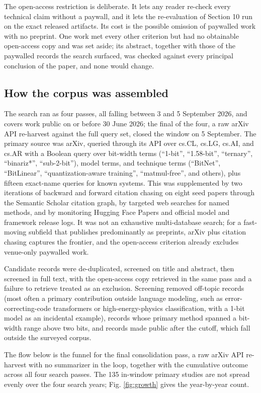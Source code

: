 \documentclass[11pt]{article}
\begin{document}
The open-access restriction is deliberate. It lets any reader re-check every technical
claim without a paywall, and it lets the re-evaluation of Section 10 run on the exact
released artifacts. Its cost is the possible omission of paywalled work with no preprint.
One work met every other criterion but had no obtainable open-access copy and was set
aside; its abstract, together with those of the paywalled records the search surfaced,
was checked against every principal conclusion of the paper, and none would change.

\subsection{How the corpus was assembled}

The search ran as four passes, all falling between 3 and 5 September 2026, and covers
work public on or before 30 June 2026; the final of the four, a raw arXiv API re-harvest
against the full query set, closed the window on 5 September. The primary source was
arXiv, queried through its API over cs.CL,
cs.LG, cs.AI, and cs.AR with a Boolean query over bit-width terms (``1-bit'', ``1.58-bit'',
``ternary'', ``binariz*'', ``sub-2-bit''), model terms, and technique terms (``BitNet'',
``BitLinear'', ``quantization-aware training'', ``matmul-free'', and others), plus fifteen
exact-name queries for known systems. This was supplemented by two iterations of
backward and forward citation chasing on eight seed papers through the Semantic Scholar
citation graph, by targeted web searches for named methods, and by monitoring Hugging
Face Papers and official model and framework release logs. It was not an exhaustive
multi-database search; for a fast-moving subfield that publishes predominantly as
preprints, arXiv plus citation chasing captures the frontier, and the open-access
criterion already excludes venue-only paywalled work.

Candidate records were de-duplicated, screened on title and abstract, then screened in
full text, with the open-access copy retrieved in the same pass and a failure to
retrieve treated as an exclusion. Screening removed off-topic records (most often a
primary contribution outside language modeling, such as error-correcting-code
transformers or high-energy-physics classification, with a 1-bit model as an incidental
example), records whose primary method spanned a bit-width range above two bits, and
records made public after the cutoff, which fall outside the surveyed corpus.

The flow below is the funnel for the final consolidation pass, a raw arXiv API
re-harvest with no summarizer in the loop, together with the cumulative outcome across
all four search passes. The 135 in-window primary studies are not spread
evenly over the four search years; Fig. \ref{fig:growth} gives the year-by-year count.
\end{document}
